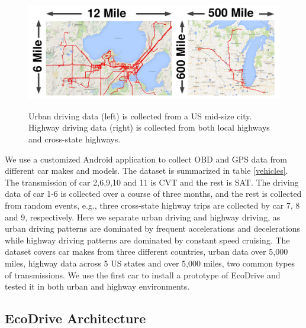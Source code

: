 \begin{figure}[t]
\begin{center}
\includegraphics[width=5.0in, angle=0]{Figs/EcoDrive/map.png}
\vspace{-0.0cm}
\caption{Urban driving data (left) is collected from a US mid-size city.  
Highway driving data (right) is collected from both local highways and cross-state highways.}
\vspace{-0.5cm}
\label{rpm_gph}
\end{center}
\end{figure}




We use a customized Android application to collect OBD and GPS data 
from different car makes and models.
The dataset is summarized in table \ref{vehicles}.
The transmission of car 2,6,9,10 and 11 is CVT and the rest is SAT. 
The driving data of car 1-6 is collected over a course of three months, 
and the rest is collected from random events, 
e.g., three cross-state highway trips are collected by car 7, 8 and 9, 
respectively. 
Here we separate urban driving and highway driving,
as urban driving patterns are dominated by frequent 
accelerations and decelerations while 
highway driving patterns are dominated by 
constant speed cruising. 
The dataset covers car makes from three different countries, 
urban data over 5,000 miles, highway data across 5 US states and 
over 5,000 miles, two common types of transmissions. 
We use the first car to install a prototype of EcoDrive and tested
it in both urban and highway environments. 




\subsection{EcoDrive Architecture}

